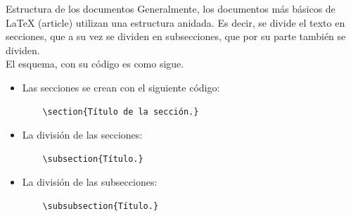 \documentclass[compress,svgnames]{beamer}
\begin{document}
\begin{frame}[fragile]{Estructura de los documentos}
Generalmente, los documentos más básicos de \LaTeX{} (article) utilizan una estructura anidada. Es decir, se divide el texto en secciones, que a su vez se dividen en subsecciones, que por su parte también se dividen.\\
El esquema, con su código es como sigue.

\begin{itemize}
	\item Las secciones se crean con el siguiente código:
	\begin{lstlisting}
	\section{Título de la sección.}
	\end{lstlisting}
	\item La división de las secciones:
	\begin{lstlisting}
	\subsection{Título.}
	\end{lstlisting}
	\item La división de las subsecciones:
	\begin{lstlisting}
	\subsubsection{Título.}
	\end{lstlisting}
\end{itemize}
\end{frame}
\end{document}

